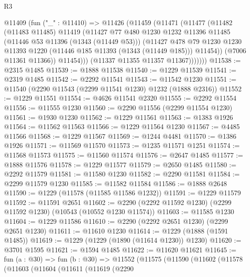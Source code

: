 \begin{lexlean}{R3}
\begin{coremodule}
            @11409
              (fun ("_" : @11410) =>
              @11426
                (@11459
                  (@11471
                    (@11477
                      (@11482
                        (@11483 @11485)
                        @11419
                        (@11427
                          @77
                          @480
                          @1230
                          @1232
                          @11396
                          @11485
                          (@11446 @53 @11396 (@1343 (@11449 @53)))
                          (@11427
                            @478
                            @79
                            @1230
                            @1230
                            @11393
                            @1220
                            (@11446 @185 @11393 (@1343 (@11449 @185)))
                            @11454))
                        (@7006 @11361 @11366))
                      @11454)))
                (@11337 @11355 @11357 @11367)))))))
@11538 := @2315 @1485
@11539 := @1888 @11538
@11540 := @1229 @11539
@11541 := @2319 @1485
@11542 := @2292 @11541
@11543 := @11542 @1230
@11551 := @11540 (@2290 @11543 (@2299 @11541 @1230) @1232 (@1888 @2316))
@11552 := @1229 @11551
@11554 := @4626 @11541 @2320
@11555 := @2292 @11554
@11556 := @11555 @1230
@11560 := @2290 @11556 (@2299 @11554 @1230)
@11561 := @1930 @1230
@11562 := @1229 @11561
@11563 := @1383 @1926
@11564 := @11562 @11563
@11566 := @1229 @11564 @1230
@11567 := @4485 @11566
@11568 := @1229 @11567
@11569 := @1244 @4481
@11570 := @1386 @1926
@11571 := @11569 @11570
@11573 := @1235 @11571 @1251
@11574 := @11568 @11573
@11575 := @11560 @11574
@11576 := @2647 @1485
@11577 := @1888 @11576
@11578 := @1229 @11577
@11579 := @2650 @1485
@11580 := @2292 @11579
@11581 := @11580 @1230
@11582 := @2290 @11581
@11584 := @2299 @11579 @1230
@11585 := @11582 @11584
@11586 := @1888 @2648
@11590 := @1229 (@11578 (@11585 @11586 @1232))
@11591 := @1229 @11579
@11592 := @11591 @2651
@11602 := @2290 (@2292 @11592 @1230) (@2299 @11592 @1230) (@10543 (@10552 @1230 @11574))
@11603 := @11585 @1230
@11604 := @1229 @11586
@11610 := @2290 (@2292 @2651 @1230) (@2299 @2651 @1230)
@11611 := @11610 @1230
@11614 := @1229 (@1888 (@1591 @1485))
@11619 := @1229 (@1229 (@1890 (@11614 @1230)) @1230)
@11620 := @3701 @1595
@11621 := @1594 @1485
@11622 := @11620 @11621
@11645 := fun (a : @30) =>
  fun (b : @30) =>
  @11552
    (@11575
      (@11590
        (@11602
          (@11578
            (@11603
              (@11604
                (@11611
                  (@11619
                    (@2290

\end{coremodule}
\end{lexlean}
